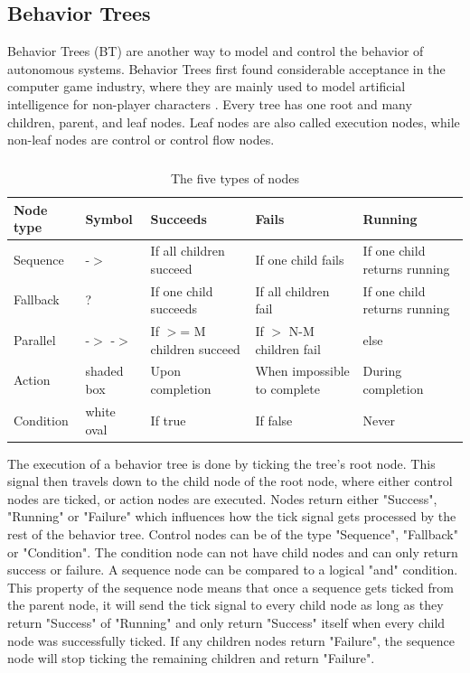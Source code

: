 \subsection{Behavior Trees}
Behavior Trees (BT) are another way to model and control the behavior of autonomous systems. Behavior Trees first found considerable acceptance in the computer game industry, where they are mainly used to model artificial intelligence for non-player characters \cite{florez2009}. Every tree has one root and many children, parent, and leaf nodes. Leaf nodes are also called execution nodes, while non-leaf nodes are control or control flow nodes. 
\subparagraph*{}
\begin{table}[ht]
	\caption{The five types of nodes \cite{iovino2022}}
	\label{tab:node_types}
	\begin{tabular}{ | m{} | m{}| m{} | m{} | m{} |} 
  	\hline
  	\textbf{Node type} & \textbf{Symbol} & \textbf{Succeeds} & \textbf{Fails} & \textbf{Running} \\ 
  	\hline
  	Sequence & -$>$ & If all children succeed &  If one child fails & If one child returns running \\ 
  	\hline
  	Fallback & ? & If one child succeeds & If all children fail & If one child returns running \\ 
  	\hline
  	Parallel & -$>$ -$>$ & If $>$= M children succeed & If $>$ N-M children fail & else \\
  	\hline
  	Action & shaded box & Upon completion & When impossible to complete & During completion \\
  	\hline
  	Condition & white oval & If true & If false & Never \\
  	\hline
	\end{tabular}
\end{table}
The execution of a behavior tree is done by ticking the tree's root node. This signal then travels down to the child node of the root node, where either control nodes are ticked, or action nodes are executed. Nodes return either "Success", "Running" or "Failure" which influences how the tick signal gets processed by the rest of the behavior tree. Control nodes can be of the type "Sequence", "Fallback" or "Condition". The condition node can not have child nodes and can only return success or failure. A sequence node can be compared to a logical "and" condition. This property of the sequence node means that once a sequence gets ticked from the parent node, it will send the tick signal to every child node as long as they return "Success" of "Running" and only return "Success" itself when every child node was successfully ticked. If any children nodes return "Failure", the sequence node will stop ticking the remaining children and return "Failure".
